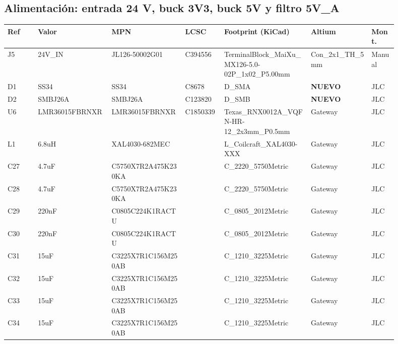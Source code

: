 \documentclass[10pt,a4paper]{article}
\begin{document}
\subsection*{Alimentación: entrada 24 V, buck 3V3, buck 5V y filtro 5V\_A}
{\scriptsize\begin{longtable}{@{}L{0.07\linewidth}L{0.17\linewidth}L{0.17\linewidth}L{0.09\linewidth}L{0.20\linewidth}L{0.14\linewidth}L{0.06\linewidth}@{}}\toprule
\textbf{Ref} & \textbf{Valor} & \textbf{MPN} & \textbf{LCSC} & \textbf{Footprint (KiCad)} & \textbf{Altium} & \textbf{Mont.}\\\midrule\endhead
J5 & 24V\_\allowbreak{}IN & JL126-50002G01 & C394556 & TerminalBlock\_\allowbreak{}MaiXu\_\allowbreak{}MX126-5.0-02P\_\allowbreak{}1x02\_\allowbreak{}P5.00mm & Con\_\allowbreak{}2x1\_\allowbreak{}TH\_\allowbreak{}5mm & Manual\\
D1 & SS34 & SS34 & C8678 & D\_\allowbreak{}SMA & \textbf{NUEVO} & JLC\\
D2 & SMBJ26A & SMBJ26A & C123820 & D\_\allowbreak{}SMB & \textbf{NUEVO} & JLC\\
U6 & LMR36015FBRNXR & LMR36015FBRNXR & C1850339 & Texas\_\allowbreak{}RNX0012A\_\allowbreak{}VQFN-HR-12\_\allowbreak{}2x3mm\_\allowbreak{}P0.5mm & Gateway & JLC\\
L1 & 6.8uH & XAL4030-682MEC &  & L\_\allowbreak{}Coilcraft\_\allowbreak{}XAL4030-XXX & Gateway & JLC\\
C27 & 4.7uF & C5750X7R2A475K230KA &  & C\_\allowbreak{}2220\_\allowbreak{}5750Metric & Gateway & JLC\\
C28 & 4.7uF & C5750X7R2A475K230KA &  & C\_\allowbreak{}2220\_\allowbreak{}5750Metric & Gateway & JLC\\
C29 & 220nF & C0805C224K1RACTU &  & C\_\allowbreak{}0805\_\allowbreak{}2012Metric & Gateway & JLC\\
C30 & 220nF & C0805C224K1RACTU &  & C\_\allowbreak{}0805\_\allowbreak{}2012Metric & Gateway & JLC\\
C31 & 15uF & C3225X7R1C156M250AB &  & C\_\allowbreak{}1210\_\allowbreak{}3225Metric & Gateway & JLC\\
C32 & 15uF & C3225X7R1C156M250AB &  & C\_\allowbreak{}1210\_\allowbreak{}3225Metric & Gateway & JLC\\
C33 & 15uF & C3225X7R1C156M250AB &  & C\_\allowbreak{}1210\_\allowbreak{}3225Metric & Gateway & JLC\\
C34 & 15uF & C3225X7R1C156M250AB &  & C\_\allowbreak{}1210\_\allowbreak{}3225Metric & Gateway & JLC\\

\end{longtable}}
\end{document}
